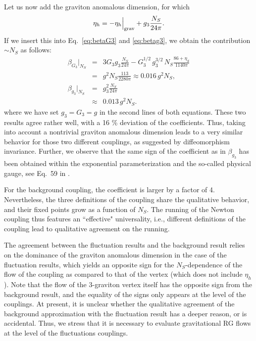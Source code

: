 \documentclass[11pt]{book} %
\newcommand{\be}{\begin{equation}}
\newcommand{\ee}{\end{equation}}
\newcommand{\bea}{\begin{eqnarray}}
\newcommand{\eea}{\end{eqnarray}}
\begin{document}
Let us now add the graviton anomalous dimension, for which
\be
\eta_h = -\eta_h\Big|_{\rm grav} + g_3 \frac{N_S}{24 \pi}.
\ee
If we insert this into Eq.~\eqref{eq:betaG3} and \eqref{eq:betag3}, we obtain the contribution $\sim N_S$ as follows:
\bea
\beta_{G_3}\Big|_{N_S}&=& 3 G_3 g_3 \frac{N_S}{24 \pi}  - G_3^{1/2} \,g_3^{3/2}\, N_S\frac{86+\eta_S}{1140 \pi}\nonumber\\
&=& g^2  N_S \frac{113}{2280 \pi} \approx 0.016\, g^2 N_S,\nonumber\\
\beta_{g_3} \Big|_{N_S}&=& g_3^2 \frac{N_S}{24 \pi}\nonumber\\
&\approx& 0.013 \,g^2 N_S.
\eea
where we have set $g_3 = G_3 = g$ in the second lines of both equations.
These two results agree rather well, with a 16 \% deviation of the coefficients. 
Thus, taking into account a nontrivial graviton anomalous dimension leads to a very similar behavior for those two different couplings, as suggested by diffeomorphism invariance.
Further, we observe that the same sign of the coefficient as in $\beta_{g_3}$ has been obtained within the exponential parameterization and the so-called physical gauge, see Eq.~59 in \cite{Dona:2015tnf}.

For the background coupling, the coefficient is larger by a factor of 4. Nevertheless, the three definitions of the coupling share the qualitative behavior, and their fixed points grow as a function of $N_S$.
The running of the Newton coupling thus features an ``effective" universality, i.e., different definitions of the coupling lead to qualitative agreement on the running.


The agreement between the fluctuation results and the background result relies on the dominance of the graviton anomalous dimension in the case of the fluctuation results,
which yields an opposite sign for the $N_S$-dependence of the flow of the coupling as compared to that of the vertex (which does not include $\eta_h$).
Note that the flow of the 3-graviton vertex itself has the opposite sign from the background result, and the equality of the signs only appears at the level of the couplings.
At present, it is unclear whether the qualitative agreement of the background approximation with the fluctuation result has a deeper reason, or is accidental.
Thus, we stress that it is necessary to evaluate gravitational RG flows at the level of the fluctuations couplings.
\end{document}
